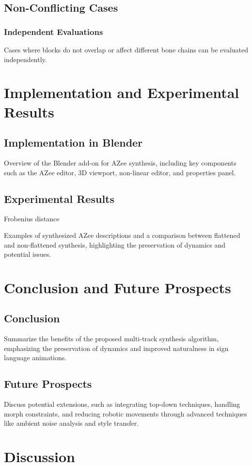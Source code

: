 \subsection{Non-Conflicting Cases}
\subsubsection{Independent Evaluations}
Cases where blocks do not overlap or affect different bone chains can be evaluated independently.

\section{Implementation and Experimental Results}
\subsection{Implementation in Blender}
Overview of the Blender add-on for AZee synthesis, including key components such as the AZee editor, 3D viewport, non-linear editor, and properties panel.

\subsection{Experimental Results}


Frobenius distance 

Examples of synthesized AZee descriptions and a comparison between flattened and non-flattened synthesis, highlighting the preservation of dynamics and potential issues.

\section{Conclusion and Future Prospects}
\subsection{Conclusion}
Summarize the benefits of the proposed multi-track synthesis algorithm, emphasizing the preservation of dynamics and improved naturalness in sign language animations.

\subsection{Future Prospects}
Discuss potential extensions, such as integrating top-down techniques, handling morph constraints, and reducing robotic movements through advanced techniques like ambient noise analysis and style transfer.



\section{Discussion}
